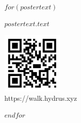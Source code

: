 \documentclass[12pt,a4paper]{book}
\begin{document}
\captionsetup[figure]{labelformat=empty}
\pagestyle{empty}

$for(postertext)$
\vspace*{\fill}
\begin{center}
    \begin{minipage}{1.0\textwidth}
        \centering 
         {\fontsize{$postertext.size$}{$postertext.size$}\selectfont\textbf{$postertext.text$}}
    \end{minipage}
\end{center}
\vfill %


\vspace*{0pt}\vfill
\hspace*{0pt}\hfill
    \begin{varwidth}{4in}
        \begin{center}
            \includegraphics[width=3cm]{qr-code}\\[1mm]
            \small https://walk.hydrus.xyz
        \end{center}
    \end{varwidth}

\clearpage

$endfor$
\end{document}
